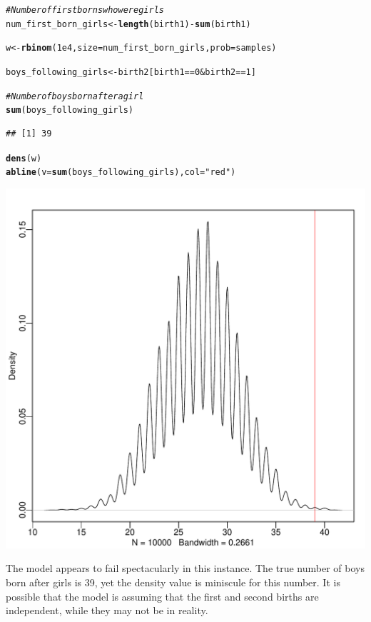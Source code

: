 \documentclass[12pt]{article}\usepackage[]{graphicx}\usepackage[]{color}
\makeatletter
\def\maxwidth{ %
  \ifdim\Gin@nat@width>\linewidth
    \linewidth
  \else
    \Gin@nat@width
  \fi
}
\newcommand{\hlnum}[1]{\textcolor[rgb]{0.686,0.059,0.569}{#1}}%
\newcommand{\hlstr}[1]{\textcolor[rgb]{0.192,0.494,0.8}{#1}}%
\newcommand{\hlcom}[1]{\textcolor[rgb]{0.678,0.584,0.686}{\textit{#1}}}%
\newcommand{\hlopt}[1]{\textcolor[rgb]{0,0,0}{#1}}%
\newcommand{\hlstd}[1]{\textcolor[rgb]{0.345,0.345,0.345}{#1}}%
\newcommand{\hlkwb}[1]{\textcolor[rgb]{0.69,0.353,0.396}{#1}}%
\newcommand{\hlkwc}[1]{\textcolor[rgb]{0.333,0.667,0.333}{#1}}%
\newcommand{\hlkwd}[1]{\textcolor[rgb]{0.737,0.353,0.396}{\textbf{#1}}}%
\newenvironment{kframe}{%
 \def\at@end@of@kframe{}%
 \ifinner\ifhmode%
  \def\at@end@of@kframe{\end{minipage}}%
  \begin{minipage}{\columnwidth}%
 \fi\fi%
 \def\FrameCommand##1{\hskip\@totalleftmargin \hskip-\fboxsep
 \colorbox{shadecolor}{##1}\hskip-\fboxsep
     \hskip-\linewidth \hskip-\@totalleftmargin \hskip\columnwidth}%
 \MakeFramed {\advance\hsize-\width
   \@totalleftmargin\z@ \linewidth\hsize
   \@setminipage}}%
 {\par\unskip\endMakeFramed%
 \at@end@of@kframe}
\newenvironment{knitrout}{}{} %
\makeatother
\begin{document}
\begin{knitrout}
\color{fgcolor}\begin{kframe}
\begin{alltt}
\hlcom{#Number of first borns who were girls}
\hlstd{num_first_born_girls} \hlkwb{<-} \hlkwd{length}\hlstd{(birth1)} \hlopt{-} \hlkwd{sum}\hlstd{(birth1)}

\hlstd{w} \hlkwb{<-} \hlkwd{rbinom}\hlstd{(}\hlnum{1e4}\hlstd{,} \hlkwc{size} \hlstd{= num_first_born_girls,} \hlkwc{prob} \hlstd{= samples)}

\hlstd{boys_following_girls} \hlkwb{<-} \hlstd{birth2[birth1} \hlopt{==} \hlnum{0} \hlopt{&} \hlstd{birth2} \hlopt{==} \hlnum{1}\hlstd{]}

\hlcom{#Number of boys born after a girl}
\hlkwd{sum}\hlstd{(boys_following_girls)}
\end{alltt}
\begin{verbatim}
## [1] 39
\end{verbatim}
\begin{alltt}
\hlkwd{dens}\hlstd{(w)}
\hlkwd{abline}\hlstd{(}\hlkwc{v} \hlstd{=} \hlkwd{sum}\hlstd{(boys_following_girls),} \hlkwc{col} \hlstd{=} \hlstr{"red"}\hlstd{)}
\end{alltt}
\end{kframe}
\includegraphics[width=\maxwidth]{figure/unnamed-chunk-21-1} 

\end{knitrout}

The model appears to fail spectacularly in this instance. The true number of boys born after girls is 39, yet the density value is miniscule for this number. It is possible that the model is assuming that the first and second births are independent, while they may not be in reality.
\end{document}
